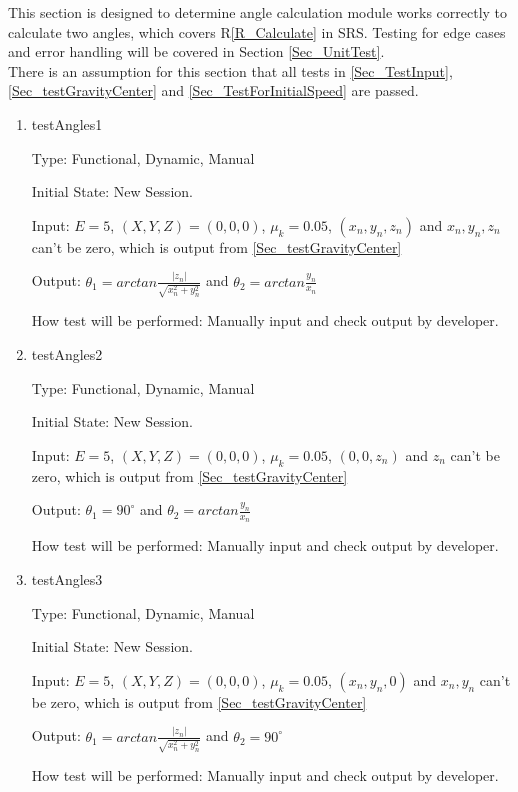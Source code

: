 \documentclass[12pt, titlepage]{article}
\newcommand{\rref}[1]{R\ref{#1}}
\begin{document}
This section is designed to determine  angle calculation module works correctly to calculate two angles, which covers \rref{R_Calculate} in SRS. Testing for edge cases and error handling will be covered in Section \ref{Sec_UnitTest}.\\
There is an assumption for this section that all tests in \ref{Sec_TestInput}, \ref{Sec_testGravityCenter} and \ref{Sec_TestForInitialSpeed} are passed.
\begin{enumerate}

\item{testAngles1\\}

Type: Functional, Dynamic, Manual

Initial State: New Session.

Input: $E = 5$, $(X,Y,Z) = (0,0,0)$, $\mu_{k} = 0.05$, $(x_{n},y_{n},z_{n})$ and $x_{n},y_{n},z_{n}$ can't be zero, which is output from \ref{Sec_testGravityCenter}  

Output: $\theta_{1}=arctan \frac{|z_{n}|}{\sqrt{x_{n}^2+y_{n}^2}}$ and $\theta_{2}=arctan \frac{y_{n}}{x_{n}}$

How test will be performed: Manually input and check output by developer.

\item{testAngles2\\}

Type: Functional, Dynamic, Manual

Initial State: New Session.

Input: $E = 5$, $(X,Y,Z) = (0,0,0)$, $\mu_{k} = 0.05$, $(0,0,z_{n})$ and $z_{n}$ can't be zero, which is output from \ref{Sec_testGravityCenter}  

Output: $\theta_{1}=90^{\circ}$ and $\theta_{2}=arctan \frac{y_{n}}{x_{n}}$

How test will be performed: Manually input and check output by developer.

\item{testAngles3\\}

Type: Functional, Dynamic, Manual

Initial State: New Session.

Input: $E = 5$, $(X,Y,Z) = (0,0,0)$, $\mu_{k} = 0.05$, $(x_{n},y_{n},0)$ and $x_{n},y_{n}$ can't be zero, which is output from \ref{Sec_testGravityCenter}  

Output: $\theta_{1}=arctan \frac{|z_{n}|}{\sqrt{x_{n}^2+y_{n}^2}}$ and $\theta_{2}=90^{\circ}$

How test will be performed: Manually input and check output by developer.

\end{enumerate}
\end{document}
